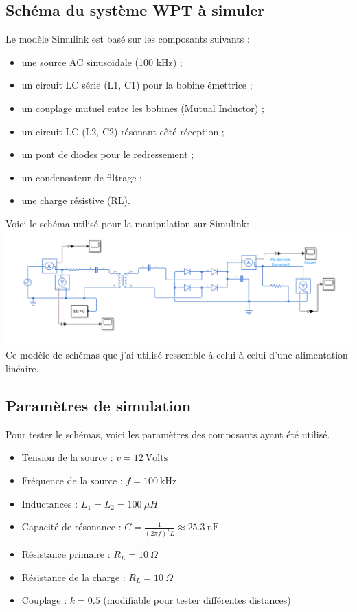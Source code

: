 \documentclass[12pt,a4paper,titlepage,notitlepage]{article}
\begin{document}
	\subsection{Schéma du système WPT à simuler}
	
	Le modèle Simulink est basé sur les composants suivants :
	\begin{itemize}
		\item une source AC sinusoïdale (100 kHz) ;
		\item un circuit LC série (L1, C1) pour la bobine émettrice ;
		\item un couplage mutuel entre les bobines (Mutual Inductor) ;
		\item un circuit LC (L2, C2) résonant côté réception ;
		\item un pont de diodes pour le redressement ;
		\item un condensateur de filtrage ;
		\item une charge résistive (RL).
	\end{itemize}
	
	Voici le schéma utilisé pour la manipulation sur Simulink:\\
	\includegraphics[width=1\textwidth]{WPT_simul}\\
	Ce modèle de schémas que j'ai utilisé ressemble à celui à celui d'une alimentation linéaire.  
	
	\subsection{Paramètres de simulation}
	Pour tester le schémas, voici les paramètres des composants ayant été utilisé.
	\begin{itemize}
		\item Tension de la source : $v = 12\ \text{Volts} $
		\item Fréquence de la source : $f = 100\ \text{kHz}$
		\item Inductances : $L_1 = L_2 = 100\ \mu H$
		\item Capacité de résonance : $C = \frac{1}{(2\pi f)^2 L} \approx 25.3\ \text{nF}$
		\item Résistance primaire : $R_L = 10\ \Omega$
		\item Résistance de la charge : $R_L = 10\ \Omega$
		\item Couplage : $k = 0.5$ (modifiable pour tester différentes distances)
	\end{itemize}
	
\end{document}
